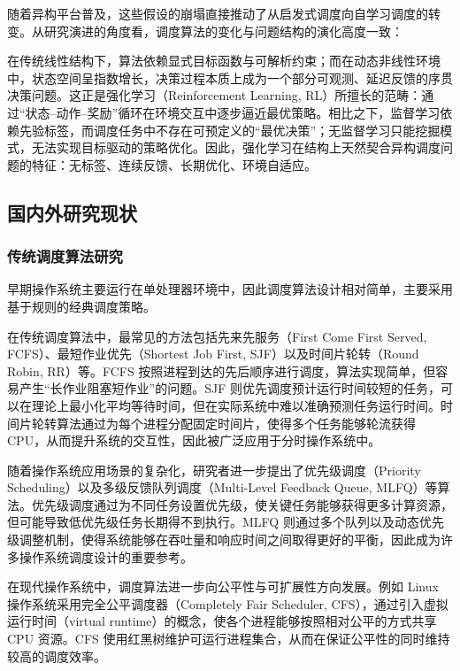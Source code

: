 随着异构平台普及，这些假设的崩塌直接推动了从启发式调度向自学习调度的转变。从研究演进的角度看，调度算法的变化与问题结构的演化高度一致：
\begin{table}[htbp]
\centering
\small
\caption{调度问题在异构计算环境中的演化}

\end{table}
在传统线性结构下，算法依赖显式目标函数与可解析约束；而在动态非线性环境中，状态空间呈指数增长，决策过程本质上成为一个部分可观测、延迟反馈的序贯决策问题。这正是强化学习（Reinforcement Learning, RL）所擅长的范畴：通过“状态–动作–奖励”循环在环境交互中逐步逼近最优策略。相比之下，监督学习依赖先验标签，而调度任务中不存在可预定义的“最优决策”；无监督学习只能挖掘模式，无法实现目标驱动的策略优化。因此，强化学习在结构上天然契合异构调度问题的特征：无标签、连续反馈、长期优化、环境自适应。

\subsection{国内外研究现状}
\subsubsection{传统调度算法研究}
早期操作系统主要运行在单处理器环境中，因此调度算法设计相对简单，主要采用基于规则的经典调度策略。

在传统调度算法中，最常见的方法包括先来先服务（First Come First Served, FCFS）、最短作业优先（Shortest Job First, SJF）以及时间片轮转（Round Robin, RR）等。FCFS 按照进程到达的先后顺序进行调度，算法实现简单，但容易产生“长作业阻塞短作业”的问题。SJF 则优先调度预计运行时间较短的任务，可以在理论上最小化平均等待时间，但在实际系统中难以准确预测任务运行时间。时间片轮转算法通过为每个进程分配固定时间片，使得多个任务能够轮流获得 CPU，从而提升系统的交互性，因此被广泛应用于分时操作系统中。

随着操作系统应用场景的复杂化，研究者进一步提出了优先级调度（Priority Scheduling）以及多级反馈队列调度（Multi-Level Feedback Queue, MLFQ）等算法。优先级调度通过为不同任务设置优先级，使关键任务能够获得更多计算资源，但可能导致低优先级任务长期得不到执行。MLFQ 则通过多个队列以及动态优先级调整机制，使得系统能够在吞吐量和响应时间之间取得更好的平衡，因此成为许多操作系统调度设计的重要参考。

在现代操作系统中，调度算法进一步向公平性与可扩展性方向发展。例如 Linux 操作系统采用完全公平调度器（Completely Fair Scheduler, CFS），通过引入虚拟运行时间（virtual runtime）的概念，使各个进程能够按照相对公平的方式共享 CPU 资源。CFS 使用红黑树维护可运行进程集合，从而在保证公平性的同时维持较高的调度效率。

